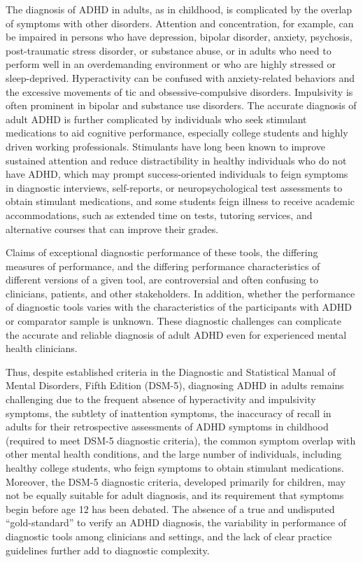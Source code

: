 \documentclass[
  12pt,
  letterpaper,
]{article}
\renewcommand{\[}{\begin{singlespace}\oldDisplayMath}
\renewcommand{\]}{\endoldDisplayMath\end{singlespace}\vspace{\baselineskip}}
\begin{document}
The diagnosis of ADHD in adults, as in childhood, is complicated by the
overlap of symptoms with other disorders. Attention and concentration,
for example, can be impaired in persons who have depression, bipolar
disorder, anxiety, psychosis, post-traumatic stress disorder, or
substance abuse, or in adults who need to perform well in an
overdemanding environment or who are highly stressed or sleep-deprived.
Hyperactivity can be confused with anxiety-related behaviors and the
excessive movements of tic and obsessive-compulsive disorders.
Impulsivity is often prominent in bipolar and substance use disorders.
The accurate diagnosis of adult ADHD is further complicated by
individuals who seek stimulant medications to aid cognitive performance,
especially college students and highly driven working professionals.
Stimulants have long been known to improve sustained attention and
reduce distractibility in healthy individuals who do not have ADHD,
which may prompt success-oriented individuals to feign symptoms in
diagnostic interviews, self-reports, or neuropsychological test
assessments to obtain stimulant medications, and some students feign
illness to receive academic accommodations, such as extended time on
tests, tutoring services, and alternative courses that can improve their
grades.

Claims of exceptional diagnostic performance of these tools, the
differing measures of performance, and the differing performance
characteristics of different versions of a given tool, are controversial
and often confusing to clinicians, patients, and other stakeholders. In
addition, whether the performance of diagnostic tools varies with the
characteristics of the participants with ADHD or comparator sample is
unknown. These diagnostic challenges can complicate the accurate and
reliable diagnosis of adult ADHD even for experienced mental health
clinicians.

Thus, despite established criteria in the Diagnostic and Statistical
Manual of Mental Disorders, Fifth Edition (DSM-5), diagnosing ADHD in
adults remains challenging due to the frequent absence of hyperactivity
and impulsivity symptoms, the subtlety of inattention symptoms, the
inaccuracy of recall in adults for their retrospective assessments of
ADHD symptoms in childhood (required to meet DSM-5 diagnostic criteria),
the common symptom overlap with other mental health conditions, and the
large number of individuals, including healthy college students, who
feign symptoms to obtain stimulant medications. Moreover, the DSM-5
diagnostic criteria, developed primarily for children, may not be
equally suitable for adult diagnosis, and its requirement that symptoms
begin before age 12 has been debated. The absence of a true and
undisputed ``gold-standard'' to verify an ADHD diagnosis, the
variability in performance of diagnostic tools among clinicians and
settings, and the lack of clear practice guidelines further add to
diagnostic complexity.
\end{document}
